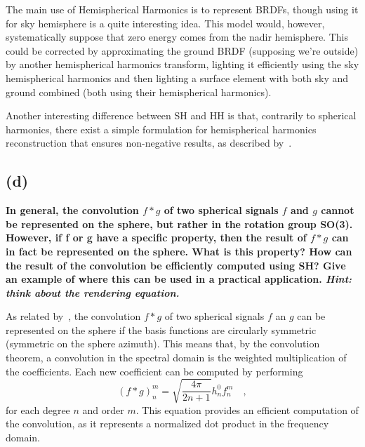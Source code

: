 \documentclass{report}
\begin{document}
The main use of Hemispherical Harmonics is to represent BRDFs, though using it for sky hemisphere is a quite interesting idea. This model would, however, systematically suppose that zero energy comes from the nadir hemisphere. This could be corrected by approximating the ground BRDF (supposing we're outside) by another hemispherical harmonics transform, lighting it efficiently using the sky hemispherical harmonics and then lighting a surface element with both sky and ground combined (both using their hemispherical harmonics).

Another interesting difference between SH and HH is that, contrarily to spherical harmonics, there exist a simple formulation for hemispherical harmonics reconstruction that ensures non-negative results, as described by~\cite{Elhabian2011}.

\subsection{(d)}
\textbf{In general, the convolution $f * g$ of two spherical signals $f$ and $g$ cannot be represented on the sphere, but rather in the rotation group SO(3). However, if f or g have a specific property, then the result of $f * g$ can in fact be represented on the sphere. What is this property? How can the result of the convolution be efficiently computed using SH? Give an example of where this can be used in a practical application. \emph{Hint: think about the rendering equation.}}

As related by~\cite{Sloan2008,jarosz-08}, the convolution $f*g$ of two spherical signals $f$ an $g$ can be represented on the sphere if the basis functions are circularly symmetric (symmetric on the sphere azimuth). This means that, by the convolution theorem, a convolution in the spectral domain is the weighted multiplication of the coefficients. Each new coefficient can be computed by performing
\begin{equation}
\left(f * g\right)_n^m = \sqrt{\frac{4\pi}{2n+1}} h_n^0 f_n^m
\quad,
\end{equation}
for each degree $n$ and order $m$. This equation provides an efficient computation of the convolution, as it represents a normalized dot product in the frequency domain.
\end{document}
